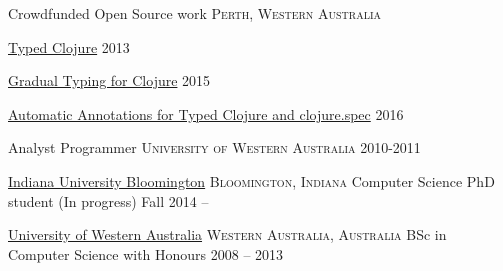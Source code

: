 \documentclass[10pt,a4paper]{article}
\begin{document}
\headedsection
  {Crowdfunded Open Source work}
  {\textsc{Perth, Western Australia}} {%
  \headedsubsection
    {\href{https://www.indiegogo.com/projects/typed-clojure}{Typed Clojure}
  }
    {2013}
    {}

  \headedsubsection
  {\href{https://www.indiegogo.com/projects/gradual-typing-for-clojure}{Gradual Typing for Clojure}
  }
    {2015}
    {}

  \headedsubsection
  {\href{https://www.indiegogo.com/projects/typed-clojure-clojure-spec-auto-annotations}{Automatic
    Annotations for Typed Clojure and clojure.spec}
  }
    {2016}
    {}
}


\headedsection
  {Analyst Programmer}
  {\textsc{University of Western Australia}} {
  {2010-2011}
  {
  }
}


\headedsection
  {\href{http://www.indiana.edu}{Indiana University Bloomington}}
  {\textsc{Bloomington, Indiana}} {%
  \headedsubsection
    {Computer Science PhD student (In progress)}
    {Fall 2014 --}
    {}
}

\headedsection
  {\href{http://www.uwa.edu.au}{University of Western Australia}}
  {\textsc{Western Australia, Australia}} {%
  \headedsubsection
    {BSc in Computer Science with Honours}
    {2008 -- 2013}
    {}
}
\end{document}
